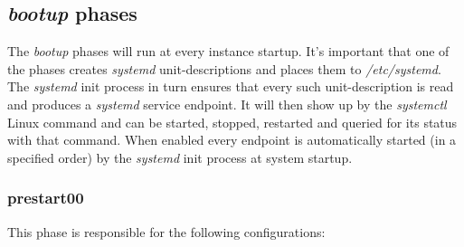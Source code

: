 		\subsection{\emph{bootup} phases}\label{p01:ch221}
			The \emph{bootup} phases will run at every instance startup. It's important that one of the phases creates \emph{systemd} unit-descriptions and places them to \emph{/etc/systemd}. The \emph{systemd} init process in turn ensures that every such unit-description is read and produces a \emph{systemd} service endpoint. It will then show up by the \emph{systemctl} Linux command and can be started, stopped, restarted and queried for its status with that command. When enabled every endpoint is automatically started (in a specified order) by the \emph{systemd} init process at system startup.
			\subsubsection{prestart00}
			This phase is responsible for the following configurations:
